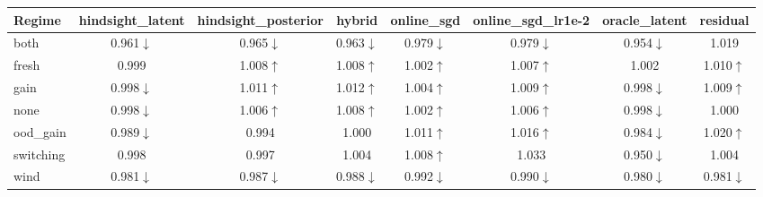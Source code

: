 \begin{tabular}{lccccccc}
\toprule
Regime & hindsight\_latent & hindsight\_posterior & hybrid & online\_sgd & online\_sgd\_lr1e-2 & oracle\_latent & residual \\
\midrule
both & 0.961$\downarrow$ & 0.965$\downarrow$ & 0.963$\downarrow$ & 0.979$\downarrow$ & 0.979$\downarrow$ & 0.954$\downarrow$ & 1.019 \\
fresh & 0.999 & 1.008$\uparrow$ & 1.008$\uparrow$ & 1.002$\uparrow$ & 1.007$\uparrow$ & 1.002 & 1.010$\uparrow$ \\
gain & 0.998$\downarrow$ & 1.011$\uparrow$ & 1.012$\uparrow$ & 1.004$\uparrow$ & 1.009$\uparrow$ & 0.998$\downarrow$ & 1.009$\uparrow$ \\
none & 0.998$\downarrow$ & 1.006$\uparrow$ & 1.008$\uparrow$ & 1.002$\uparrow$ & 1.006$\uparrow$ & 0.998$\downarrow$ & 1.000 \\
ood\_gain & 0.989$\downarrow$ & 0.994 & 1.000 & 1.011$\uparrow$ & 1.016$\uparrow$ & 0.984$\downarrow$ & 1.020$\uparrow$ \\
switching & 0.998 & 0.997 & 1.004 & 1.008$\uparrow$ & 1.033 & 0.950$\downarrow$ & 1.004 \\
wind & 0.981$\downarrow$ & 0.987$\downarrow$ & 0.988$\downarrow$ & 0.992$\downarrow$ & 0.990$\downarrow$ & 0.980$\downarrow$ & 0.981$\downarrow$ \\
\bottomrule
\end{tabular}
